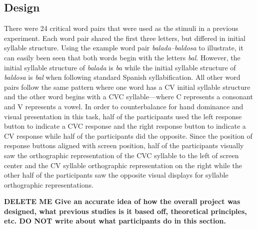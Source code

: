 \subsection{Design}
There were 24 critical word pairs that were used as the stimuli in a previous experiment. Each word pair shared the first three letters, but differed in initial syllable structure. Using the example word pair \emph{balada–baldosa} to illustrate, it can easily been seen that both words begin with the letters \emph{bal}. However, the initial syllable structure of \emph{balada} is \emph{ba} while the initial syllable structure of \emph{baldosa} is \emph{bal} when following standard Spanish syllabification. All other word pairs follow the same pattern where one word has a CV initial syllable structure and the other word begins with a CVC syllable---where C represents a consonant and V represents a vowel. In order to counterbalance for hand dominance and visual presentation in this task, half of the participants used the left response button to indicate a CVC response and the right response button to indicate a CV response while half of the participants did the opposite. Since the position of response buttons aligned with screen position, half of the participants visually saw the orthographic representation of the CVC syllable to the left of screen center and the CV syllable orthographic representation on the right while the other half of the participants saw the opposite visual displays for syllable orthographic representations.

\textbf{DELETE ME Give an accurate idea of how the overall project was designed, what previous studies is it based off, theoretical principles, etc.
DO NOT write about what participants do in this section.}

